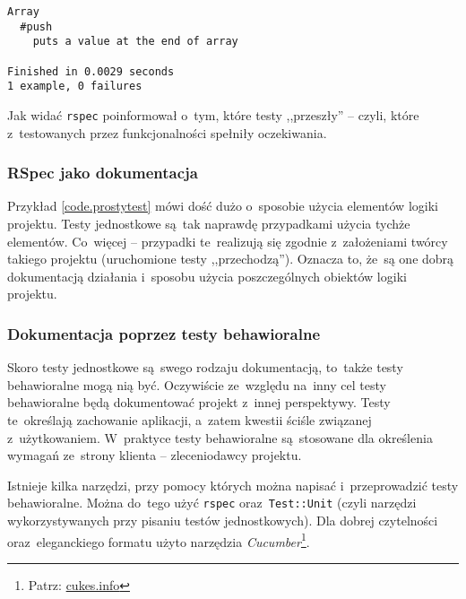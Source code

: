   \begin{lstlisting}
Array
  #push
    puts a value at the end of array

Finished in 0.0029 seconds
1 example, 0 failures
\end{lstlisting}

Jak widać \texttt{rspec} poinformował o~tym, które testy ,,przeszły'' -- czyli, które z~testowanych przez funkcjonalności spełniły oczekiwania.

\subsubsection{RSpec jako dokumentacja}

Przykład \ref{code.prostytest} mówi dość dużo o~sposobie użycia elementów logiki projektu. Testy jednostkowe są~tak naprawdę przypadkami użycia tychże elementów. Co~więcej -- przypadki te~realizują się zgodnie z~założeniami twórcy takiego projektu (uruchomione testy ,,przechodzą''). Oznacza to, że~są one dobrą dokumentacją działania i~sposobu użycia poszczególnych obiektów logiki projektu.

\subsubsection{Dokumentacja poprzez testy behawioralne} \label{dokumentacja.cucumber}

Skoro testy jednostkowe są~swego rodzaju dokumentacją, to~także testy behawioralne mogą nią być. Oczywiście ze~względu na~inny cel testy behawioralne będą dokumentować projekt z~innej perspektywy. Testy te~określają zachowanie aplikacji, a~zatem kwestii ściśle związanej z~użytkowaniem. W~praktyce testy behawioralne są~stosowane dla określenia wymagań ze~strony klienta -- zleceniodawcy projektu.


Istnieje kilka narzędzi, przy pomocy których można napisać i~przeprowadzić testy behawioralne. Można do~tego użyć \texttt{rspec} oraz~\texttt{Test::Unit} (czyli narzędzi wykorzystywanych przy pisaniu testów jednostkowych). Dla dobrej czytelności oraz~eleganckiego formatu użyto narzędzia \textit{Cucumber}\footnote{Patrz: \url{cukes.info}}.
